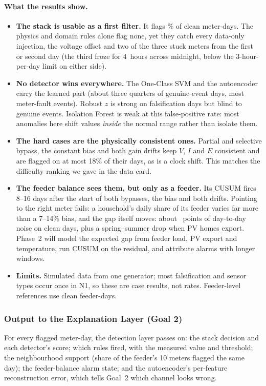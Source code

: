 \paragraph{What the results show.}
\begin{itemize}[leftmargin=*,itemsep=2pt]
  \item \textbf{The stack is usable as a first filter.} It flags \stackFPR\% of clean meter-days. The physics
        and domain rules alone flag none, yet they catch every data-only injection, the voltage offset and two of
        the three stuck meters from the first or second day (the third froze for 4~hours across midnight,
        below the 3-hour-per-day limit on either side).
  \item \textbf{No detector wins everywhere.} The One-Class SVM and the autoencoder carry the learned part
        (about three quarters of genuine-event days, most meter-fault events). Robust $z$ is strong on
        falsification days but blind to genuine events. Isolation Forest is weak at this false-positive rate:
        most anomalies here shift values \emph{inside} the normal range rather than isolate them.
  \item \textbf{The hard cases are the physically consistent ones.} Partial and selective bypass, the
        constant bias and both gain drifts keep $V$, $I$ and $E$ consistent and are flagged on at most 18\% of
        their days, as is a clock shift. This matches the difficulty ranking we gave in the data card.
  \item \textbf{The feeder balance sees them, but only as a feeder.} Its CUSUM fires 8--16 days after the start
        of both bypasses, the bias and both drifts. Pointing to the right meter fails: a household's daily
        share of its feeder varies far more than a 7--14\% bias, and the gap itself moves: about \gapSd{}~points of
        day-to-day noise on clean days, plus a spring--summer drop when PV homes export. Phase~2 will model
        the expected gap from feeder load, PV export and temperature, run CUSUM on the residual, and attribute
        alarms with longer windows.
  \item \textbf{Limits.} Simulated data from one generator; most falsification and sensor types occur once in
        N1, so these are case results, not rates. Feeder-level references use clean feeder-days.
\end{itemize}

\subsubsection{Output to the Explanation Layer (Goal 2)}
For every flagged meter-day, the detection layer passes on: the stack decision and each detector's score; which rules
fired, with the measured value and threshold; the neighbourhood support (share of the feeder's 10 meters flagged
the same day); the feeder-balance alarm state; and the autoencoder's per-feature reconstruction error, which
tells Goal~2 which channel looks wrong.

